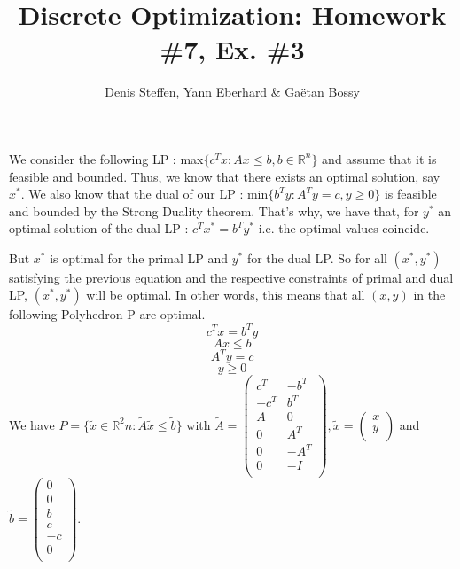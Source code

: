 \documentclass[a4paper,11pt,french]{article}
\title{Discrete Optimization: Homework \#7, Ex. \#3}
\author{Denis Steffen, Yann Eberhard \& Gaëtan Bossy}
\begin{document}
    
    \maketitle
   We consider the following LP :  max$\{ c^Tx : Ax \leq b, b\in \mathbb{R}^n \} $ and assume that it is feasible and bounded. Thus, we know that there exists an optimal solution, say $x^*$. 
   We also know that the dual of our LP : min$ \{ b^Ty : A^Ty = c, y \geq 0 \} $ is feasible and bounded by the Strong Duality theorem. That's why, we have that, for $y^*$ an optimal solution of the dual LP : 
   $c^Tx^* = b^Ty^*$ i.e. the optimal values coincide. 

   But $x^*$ is optimal for the primal LP and $y^*$ for the dual LP. So for all $(x^*, y^*)$ satisfying the previous equation and the respective constraints of primal and dual LP, $(x^*, y^*)$ will be optimal. 
   In other words, this means that all $(x, y)$ in the following Polyhedron P are optimal.
\begin{displaymath}
     c^Tx = b^Ty
    \end{displaymath} 
    \begin{displaymath}
       Ax \leq b
     \end{displaymath}
     \begin{displaymath}
      A^Ty = c
    \end{displaymath}
    \begin{displaymath}
      y \geq 0
    \end{displaymath}
    We have $ P = \{ \tilde{x} \in \mathbb{R}^2n : \tilde{A} \tilde{x} \leq \tilde{b} \} $ with $\tilde{A} =  \begin{pmatrix}
       c^T & -b^T\\
      -c^T & b^T\\
      A & 0\\
      0 & A^T\\
      0 & -A^T\\
      0 & -I\\
    \end{pmatrix},
      \tilde{x} = 
    \left(\begin{array}{c}
      x\\
      y\\
    \end{array} \right)$ and $ \tilde{b} = \left( \begin{array}{c} 
    0\\
    0\\
    b\\
    c\\
    -c\\ 
    0\\
    \end{array} 
    \right).$ 
\end{document}
